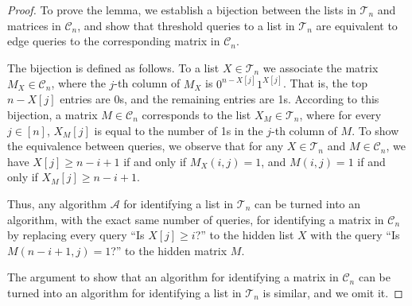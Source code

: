 \documentclass[10pt,a4paper]{amsart}
\newcommand{\cA}{\mathcal{A}}
\newcommand{\cC}{\mathcal{C}}
\newcommand{\cT}{\mathcal{T}}
\begin{document}
\begin{proof}
    To prove the lemma, we establish a bijection between the lists in $\cT_n$ and matrices in $\cC_n$, and show that threshold queries to a list in $\cT_n$ are equivalent to edge queries to the corresponding matrix in $\cC_n$.

    The bijection is defined as follows. To a list $X \in \cT_n$ we associate the matrix $M_X \in \cC_n$, where the $j$-th column of $M_X$ is $0^{n - X[j]}1^{X[j]}$. That is, the top $n - X[j]$ entries are 0s, and the remaining entries are 1s. According to this bijection, a matrix $M \in \cC_n$ corresponds to the list $X_M \in \cT_n$, where for every $j \in [n]$, $X_M[j]$ is equal to the number of 1s in the $j$-th column of $M$.
    To show the equivalence between queries, we observe that for any $X \in \cT_n$ and $M \in \cC_n$, we have 
    $X[j] \geq n - i + 1$ if and only if $M_X(i, j) = 1$, and
    $M(i, j) = 1$ if and only if $X_M[j] \geq n - i + 1$.
    
    Thus, any algorithm $\cA$ for identifying a list in $\cT_n$ can be turned into an algorithm, with the exact same number of queries, for identifying a matrix in $\cC_n$ by replacing every query ``Is $X[j] \geq i$?'' to the hidden list $X$ with the query ``Is $M(n-i+1,j) = 1$?'' to the hidden matrix $M$.

    The argument to show that an algorithm for identifying a matrix in $\cC_n$ can be turned into an algorithm for identifying a list in $\cT_n$ is similar, and we omit it.
\end{proof}
\end{document}
